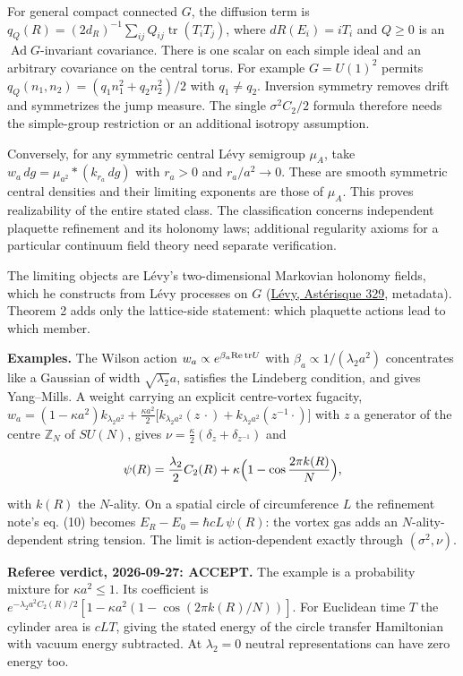 \documentclass[11pt,a4paper]{article}
\begin{document}
For general compact connected \(G\), the diffusion term is
\(q_Q(R)=(2d_R)^{-1}\sum_{ij}Q_{ij}\operatorname{tr}(T_iT_j)\), where
\(dR(E_i)=iT_i\) and \(Q\ge0\) is an \(\operatorname{Ad}G\)-invariant
covariance. There is one scalar on each simple ideal and an arbitrary
covariance on the central torus. For example \(G=U(1)^2\) permits
\(q_Q(n_1,n_2)=(q_1n_1^2+q_2n_2^2)/2\) with \(q_1\ne q_2\). Inversion
symmetry removes drift and symmetrizes the jump measure. The single
\(\sigma^2C_2/2\) formula therefore needs the simple-group restriction
or an additional isotropy assumption.

Conversely, for any symmetric central Lévy semigroup \(\mu_A\), take
\(w_a\,dg=\mu_{a^2}*(k_{r_a}\,dg)\) with \(r_a>0\) and \(r_a/a^2\to0\).
These are smooth symmetric central densities and their limiting
exponents are those of \(\mu_A\). This proves realizability of the
entire stated class. The classification concerns independent plaquette
refinement and its holonomy laws; additional regularity axioms for a
particular continuum field theory need separate verification.

The limiting objects are Lévy's two-dimensional Markovian holonomy
fields, which he constructs from Lévy processes on \(G\)
(\href{https://doi.org/10.24033/ast.785}{Lévy, Astérisque 329},
metadata). Theorem 2 adds only the lattice-side statement: which
plaquette actions lead to which member.

\textbf{Examples.} The Wilson action
\(w_a\propto e^{\beta_a{\rm Re\,tr}U}\) with
\(\beta_a\propto1/(\lambda_2a^2)\) concentrates like a Gaussian of width
\(\sqrt{\lambda_2}a\), satisfies the Lindeberg condition, and gives
Yang--Mills. A weight carrying an explicit centre-vortex fugacity,
\(w_a=(1-\kappa a^2)k_{\lambda_2a^2}+\frac{\kappa a^2}2\bigl[k_{\lambda_2a^2}(z\,\cdot) +k_{\lambda_2a^2}(z^{-1}\cdot)\bigr]\)
with \(z\) a generator of the centre \(\mathbb Z_N\) of \(SU(N)\), gives
\(\nu=\frac\kappa2(\delta_z+\delta_{z^{-1}})\) and

\[\psi(R)=\frac{\lambda_2}2C_2(R)+\kappa\Bigl(1-\cos\frac{2\pi k(R)}N\Bigr),\]

with \(k(R)\) the \(N\)-ality. On a spatial circle of circumference
\(L\) the refinement note's eq. (10) becomes
\(E_R-E_0=\hbar cL\,\psi(R)\): the vortex gas adds an
\(N\)-ality-dependent string tension. The limit is action-dependent
exactly through \((\sigma^2,\nu)\).

\textbf{Referee verdict, 2026-09-27: ACCEPT.} The example is a
probability mixture for \(\kappa a^2\le1\). Its coefficient is
\(e^{-\lambda_2a^2C_2(R)/2}[1-\kappa a^2(1-\cos(2\pi k(R)/N))]\). For
Euclidean time \(T\) the cylinder area is \(cLT\), giving the stated
energy of the circle transfer Hamiltonian with vacuum energy subtracted.
At \(\lambda_2=0\) neutral representations can have zero energy too.
\end{document}
